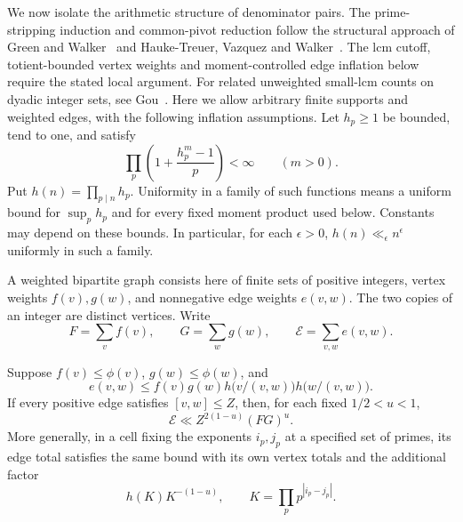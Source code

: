 We now isolate the arithmetic structure of denominator pairs.
The prime-stripping induction and common-pivot reduction follow the
structural approach of Green and Walker~\cite[Proposition~1.2 and
Section~3]{GW2021} and Hauke-Treuer, Vazquez and
Walker~\cite[Proposition~2.1]{HVW2026}. The lcm cutoff, totient-bounded
vertex weights and moment-controlled edge inflation below require
the stated local argument. For related unweighted small-lcm counts
on dyadic integer sets, see Gou~\cite[Corollary~1.4 and
Theorem~1.5]{Gou2026}. Here we allow arbitrary finite supports and
weighted edges, with the following inflation assumptions. Let
$h_p\ge1$ be bounded, tend to one, and satisfy
\begin{equation}\label{ar:h-moments}
 \prod_p\left(1+\frac{h_p^m-1}{p}\right)<\infty
 \qquad(m>0).
\end{equation}
Put $h(n)=\prod_{p\mid n}h_p$. Uniformity in a family of such functions
means a uniform bound for $\sup_ph_p$ and for every fixed moment product
used below. Constants may depend on these bounds. In particular, for
each $\epsilon>0$, $h(n)\ll_\epsilon n^\epsilon$ uniformly in such a
family.

A weighted bipartite graph consists here of finite sets of positive
integers, vertex weights $f(v),g(w)$, and nonnegative edge weights
$e(v,w)$. The two copies of an integer are distinct vertices. Write
\[
 F=\sum_vf(v),\qquad G=\sum_wg(w),\qquad
 \mathcal E=\sum_{v,w}e(v,w).
\]

\begin{proposition}\label{ar:lcm}
Suppose $f(v)\le\phi(v)$, $g(w)\le\phi(w)$, and
\[
 e(v,w)\le f(v)g(w)
 h\bigl(v/(v,w)\bigr)h\bigl(w/(v,w)\bigr).
\]
If every positive edge satisfies $[v,w]\le Z$, then, for each fixed
$1/2<u<1$,
\begin{equation}\label{eq:lcm}
 \mathcal E\ll Z^{2(1-u)}(FG)^u.
\end{equation}
More generally, in a cell fixing the exponents $i_p,j_p$ at a specified
set of primes, its edge total satisfies the same bound with its own
vertex totals and the additional factor
\[
 h(K)K^{-(1-u)},\qquad K=\prod_p p^{|i_p-j_p|}.
\]
\end{proposition}

